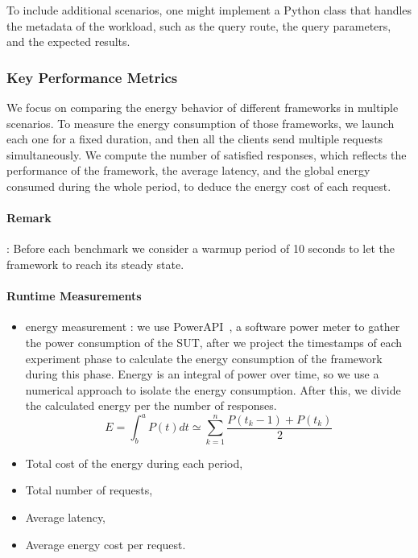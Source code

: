 To include additional scenarios, one might implement a Python class that handles the metadata of the workload, such as the query route, the query parameters, and the expected results.
\subsubsection{Key Performance Metrics}
We focus on comparing the energy behavior of different frameworks in multiple scenarios.
To measure the energy consumption of those frameworks, we launch each one for a fixed duration, and then all the clients send multiple requests simultaneously.
We compute the number of satisfied responses, which reflects the performance of the framework, the average latency, and the global energy consumed during the whole period, to deduce the energy cost of each request.

\paragraph{Remark}:
Before each benchmark we consider a warmup period of 10 seconds to let the framework to reach its steady state.

\paragraph{Runtime Measurements}
\begin{itemize}
    \item energy measurement :
          we use PowerAPI~\cite{bourdon:hal-00772454}, a software power meter to gather the power consumption of the SUT, after we project the timestamps of each experiment phase to calculate the energy consumption of the framework during this phase.
          Energy is an integral of power over time, so we use a numerical approach to isolate the energy consumption.%
          After this, we divide the calculated energy per the number of responses.
          \begin{equation}
              E = \int^a_b P(t)dt \simeq \sum^n_{k=1} \frac{P(t_k-1)+P(t_k)}{2}
          \end{equation}
    \item Total cost of the energy during each period,
    \item Total number of requests,
    \item Average latency,
    \item Average energy cost per request.
\end{itemize}


